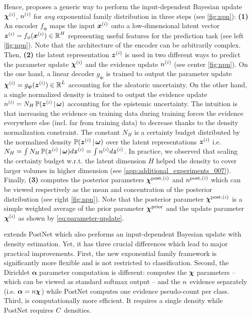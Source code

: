 Hence, \NatPNacro{} proposes a generic way to perform the input-dependent Bayesian update $\bm{\chi}^{(i)}$, $n^{(i)}$ for \emph{any} exponential family distribution in three steps (see \cref{fig:npn}): \textbf{(1)} An encoder $f_{\bm{\phi}}$ maps the input $\bm{x}^{(i)}$ onto a low-dimensional latent vector $\bm{z}^{(i)} = f_{\phi}(\bm{x}^{(i)}) \in \operatorname{\mathbb{R}}^H$ representing useful features for the prediction task (see left \cref{fig:npn}). Note that the architecture of the encoder can be arbitrarily complex. Then, \textbf{(2)} the latent representation $\bm{z}^{(i)}$ is used in two different ways to predict the parameter update $\bm{\chi}^{(i)}$ and the evidence update $n^{(i)}$ (see center \cref{fig:npn}). On the one hand, a linear decoder $g_{\bm{\psi}}$ is trained to output the parameter update $\bm{\chi}^{(i)} = g_{\bm{\psi}}(\bm{z}^{(i)}) \in \operatorname{\mathbb{R}}^L$ accounting for the aleatoric uncertainty. On the other hand, a single normalized density is trained to output the evidence update $n^{(i)} = N_H\operatorname{\mathbb{P}}(\bm{z}^{(i)} \,|\, \bm{\omega})$ accounting for the epistemic uncertainty. The intuition is that increasing the evidence on training data during training forces the evidence everywhere else (incl. far from training data) to decrease thanks to the density normalization constraint. The constant $N_H$ is a certainty budget distributed by the normalized density $\operatorname{\mathbb{P}}(\bm{z}^{(i)} \,|\, \bm{\omega})$ over the latent representations $\bm{z}^{(i)}$ i.e. $N_H = \int N_H \operatorname{\mathbb{P}}(\bm{z}^{(i)} \,|\, \bm{\omega}) d\bm{z}^{(i)} = \int n^{(i)} d\bm{z}^{(i)}$. In practice, we observed that scaling the certainty budget w.r.t. the latent dimension $H$ helped the density to cover larger volumes in higher dimension (see \cref{app:additional_experiments_007}). Finally, \textbf{(3)} \NatPNacro{} computes the posterior parameters $\bm{\chi}^{\text{post}, (i)}$ and $n^{\text{post}, (i)}$ which can be viewed respectively as the mean and concentration of the posterior distribution (see right \cref{fig:npn}). Note that the posterior parameter $\bm{\chi}^{\text{post}, (i)}$ is a simple weighted average of the prior parameter $\bm{\chi}^\text{prior}$ and the update parameter $\bm{\chi}^{(i)}$ as shown by \cref{eq:parameter-update}.

\NatPNacro{} extends PostNet \citep{charpentier2020} which also performs an input-dependent Bayesian update with density estimation. Yet, it has three crucial differences which lead to major practical improvements. First, the new exponential family framework is significantly more flexible and is not restricted to classification. Second, the Dirichlet $\bm{\alpha}$ parameter computation is different: \NatPNacro{} computes the $\bm{\chi}$ parameters -- which can be viewed as standard softmax output -- and the $n$ evidence separately (i.e. $\bm{\alpha} = n \bm{\chi}$) while PostNet computes one evidence pseudo-count per class. Third, \NatPNacro{} is computationally more efficient. It requires a single density while PostNet requires $C$ densities.

